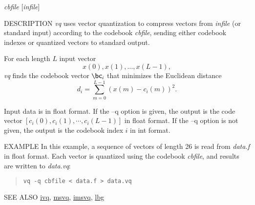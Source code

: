 \begin{synopsis}
\item [vq] [ --l $L$ ] [ --n $N$ ] [ --q ] {\em cbfile} [{\em infile}]
\end{synopsis}

\begin{qsection}{DESCRIPTION}
{\em vq} uses vector quantization to compress vectors 
from {\em infile} (or standard input)
according to the codebook {\em cbfile}, 
sending either codebook indexes or quantized vectors to standard output.

For each length $L$ input vector
\begin{displaymath}
  x(0),x(1),\dots,x(L-1),
\end{displaymath}
{\em vq} finds the codebook vector $\bc_i$ 
that minimizes the Euclidean distance
\begin{displaymath}
d_i = \sum_{m=0}^{L-1} (x(m)-c_i(m))^2. 
\end{displaymath}

Input data is in float format.
If the --q option is given, 
the output is the code vector $[c_i(0), c_i(1), \cdots, c_i(L-1)]$ 
in float format.
If the --q option is not given, 
the output is the codebook index $i$ in int format.
\end{qsection}

\begin{options}
\end{options}

\begin{qsection}{EXAMPLE}
In this example, a sequence of vectors of length 26 is read from
{\em data.f} in float format.
Each vector is quantized using the codebook {\em cbfile},
and results are written to {\em data.vq}:
\begin{quote}
 \verb!vq -q cbfile < data.f > data.vq!
\end{quote} 
\end{qsection}

\begin{qsection}{SEE ALSO}
\hyperlink{ivq}{ivq},
\hyperlink{msvq}{msvq},
\hyperlink{imsvq}{imsvq},
\hyperlink{lbg}{lbg}
\end{qsection}
